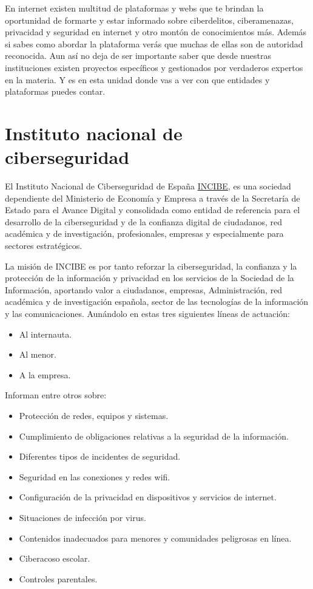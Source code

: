 \documentclass[
  spanish,
  a4paper,
  openany]{book}
\begin{document}
En internet existen multitud de plataformas y webs que te brindan la oportunidad de formarte y estar informado sobre ciberdelitos, ciberamenazas, privacidad y seguridad en internet y otro montón de conocimientos más. Además si sabes como abordar la plataforma verás que muchas de ellas son de autoridad reconocida. Aun así no deja de ser importante saber que desde nuestras instituciones existen proyectos específicos y gestionados por verdaderos expertos en la materia. Y es en esta unidad donde vas a ver con que entidades y plataformas puedes contar.

\hypertarget{instituto-nacional-de-ciberseguridad}{%
\section{Instituto nacional de ciberseguridad}\label{instituto-nacional-de-ciberseguridad}}

El Instituto Nacional de Ciberseguridad de España \href{https://www.incibe.es/}{INCIBE}, es una sociedad dependiente del Ministerio de Economía y Empresa a través de la Secretaría de Estado para el Avance Digital y consolidada como entidad de referencia para el desarrollo de la ciberseguridad y de la confianza digital de ciudadanos, red académica y de investigación, profesionales, empresas y especialmente para sectores estratégicos.

La misión de INCIBE es por tanto reforzar la ciberseguridad, la confianza y la protección de la información y privacidad en los servicios de la Sociedad de la Información, aportando valor a ciudadanos, empresas, Administración, red académica y de investigación española, sector de las tecnologías de la información y las comunicaciones. Aunándolo en estas tres siguientes líneas de actuación:

\begin{itemize}
\item
  Al internauta.
\item
  Al menor.
\item
  A la empresa.
\end{itemize}

Informan entre otros sobre:

\begin{itemize}
\item
  Protección de redes, equipos y sistemas.
\item
  Cumplimiento de obligaciones relativas a la seguridad de la información.
\item
  Diferentes tipos de incidentes de seguridad.
\item
  Seguridad en las conexiones y redes wifi.
\item
  Configuración de la privacidad en dispositivos y servicios de internet.
\item
  Situaciones de infección por virus.
\item
  Contenidos inadecuados para menores y comunidades peligrosas en línea.
\item
  Ciberacoso escolar.
\item
  Controles parentales.
\end{itemize}
\end{document}
